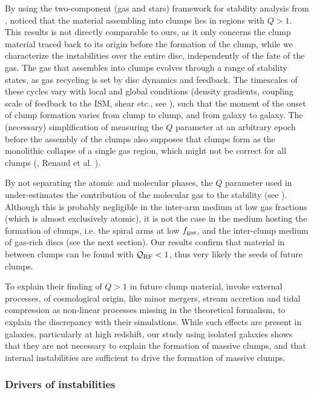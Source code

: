 \documentclass[useAMS,usenatbib]{mnras}
\newcommand{\fgas}{\ensuremath{f_{\rm gas}}\xspace}
\newcommand{\qrf}{\ensuremath{\mathcal{Q}_{\rm RF}}\xspace}
\begin{document}
By using the two-component (gas and stars) framework for stability analysis from \citet{Romeo2011}, \citet{Inoue2016} noticed that the material assembling into clumps lies in regions with $Q > 1$. This results is not directly comparable to ours, as it only concerns the clump material traced back to its origin before the formation of the clump, while we characterize the instabilities over the entire disc, independently of the fate of the gas. The gas that assembles into clumps evolves through a range of stability states, as gas recycling is set by disc dynamics and feedback. The timescales of these cycles vary with local and global conditions (density gradients, coupling scale of feedback to the ISM, shear etc., see \citealt{Semenov2017}), such that the moment of the onset of clump formation varies from clump to clump, and from galaxy to galaxy. The (necessary) simplification of measuring the $Q$ parameter at an arbitrary epoch before the assembly of the clumps also supposes that clumps form as the monolithic collapse of a single gas region, which might not be correct for all clumps (\citealt{Behrendt2019}, Renaud et al. \inprep).

By not separating the atomic and molecular phases, the $Q$ parameter used in \citet{Inoue2016} under-estimates the contribution of the molecular gas to the stability (see \citealt{Romeo2013}). Although this is probably negligible in the inter-arm medium at low gas fractions (which is almost exclusively atomic), it is not the case in the medium hosting the formation of clumps, i.e. the spiral arms at low \fgas, and the inter-clump medium of gas-rich discs (see the next section). Our results confirm that material in between clumps can be found with $\qrf < 1$, thus very likely the seeds of future clumps.

To explain their finding of $Q > 1$ in future clump material, \citet{Inoue2016} invoke external processes, of cosmological origin, like minor mergers, stream accretion and tidal compression as non-linear processes missing in the theoretical formalism, to explain the discrepancy with their simulations. While such effects are present in galaxies, particularly at high redshift, our study using isolated galaxies shows that they are not necessary to explain the formation of massive clumps, and that internal instabilities are sufficient to drive the formation of massive clumps.


\subsubsection{Drivers of instabilities}
\label{sec:drivers}
\end{document}
